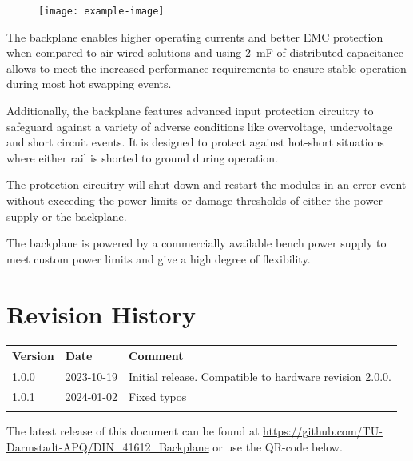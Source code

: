 \documentclass[10pt]{datasheet}
\begin{document}
\begin{figure}[ht]
    \centering
    \texttt{[image: example-image]}
\end{figure}

The backplane enables higher operating currents and better EMC protection when compared to air wired solutions and using \qty{2}{\milli\farad} of distributed capacitance allows to meet the increased performance requirements to ensure stable operation during most hot swapping events.

Additionally, the backplane features advanced input protection circuitry to safeguard against a variety of adverse conditions like overvoltage, undervoltage and short circuit events. It is designed to protect against hot-short situations where either rail is shorted to ground during operation.

The protection circuitry will shut down and restart the modules in an error event without exceeding the power limits or damage thresholds of either the power supply or the backplane.

The backplane is powered by a commercially available bench power supply to meet custom power limits and give a high degree of flexibility.

\vfill\break

\onecolumn

\section{Revision History}
\begin{table}[h]
    \centering
    \begin{tabularx}{\textwidth}{l| l | >{\raggedright\arraybackslash}X}
        \thickhline
        Version& Date& Comment\\
        \hline
        1.0.0 &2023-10-19 & Initial release. Compatible to hardware revision 2.0.0.\\
        1.0.1 &2024-01-02 & Fixed typos\\
        \thickhline
    \end{tabularx}
\end{table}

The latest release of this document can be found at \url{https://github.com/TU-Darmstadt-APQ/DIN_41612_Backplane} or use the QR-code below.

\begin{center}
\end{center}
\end{document}
